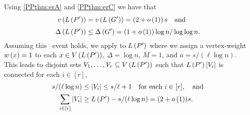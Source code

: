 Using \ref{PPthm:erA} and \ref{PPthm:erC} we have that \whp\
\begin{align*}
v\left({L\left(P'\right)}\right)&=v\left({L\left(G'\right)}\right)=\left(2+o\left(1\right)\right)s \quad \text{and}   \\[0.1cm]
\Delta\left(L\left(P'\right)\right)&\leq \Delta\left(G'\right)=\left(1+o\left(1\right)\right)\log n/\log \log n.
\end{align*}
Assuming this \whp\ event holds, we apply  to $L\left(P'\right)$ where we assign a vertex-weight $w\left(x\right)=1$ to each $x\in V\left(L\left(P'\right)\right)$, $\Delta=\log n$, $M=1$, and $a=s/(\ell \log n)$. This leads to disjoint sets $V_1, \ldots, V_r \subseteq V\left(L\left(P'\right)\right)$ such that $L\left(P'\right)\left[V_i\right]$ is connected for each $i\in[r]$, 
\begin{align}
s/(\ell \log n)&\leq |V_i|\leq s/\ell+1 \quad \text{for each }i\in[r], \quad \text{and}\label{PPeq:3}\\
\sum_{i\in[r]}|V_i|&\geq L\left(P'\right)-s/(\ell \log n)=(2+o\left(1\right))s. \label{PPeq:4}
\end{align}

